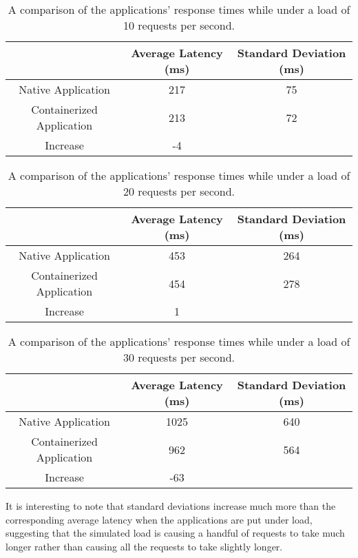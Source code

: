 \documentclass{article}
\begin{document}
\begin{table}[H]
\begin{tabular}{ |c|c|c| }
 \hline
 & Average Latency (ms) & Standard Deviation (ms) \\
 \hline
 Native Application & 217 & 75 \\
 \hline
 Containerized Application & 213 & 72 \\
 \hline\hline
 Increase & -4 & \\
 \hline
\end{tabular}
\caption{A comparison of the applications' response times while under a load of 10 requests per second.}
\label{latency-under-load-10}
\end{table}

\begin{table}[H]
\begin{tabular}{ |c|c|c| }
 \hline
 & Average Latency (ms) & Standard Deviation (ms) \\
 \hline
 Native Application & 453 & 264 \\
 \hline
 Containerized Application & 454 & 278 \\
 \hline\hline
 Increase & 1 & \\
 \hline
\end{tabular}
\caption{A comparison of the applications' response times while under a load of 20 requests per second.}
\label{latency-under-load-20}
\end{table}

\begin{table}[H]
\begin{tabular}{ |c|c|c| }
 \hline
 & Average Latency (ms) & Standard Deviation (ms) \\
 \hline
 Native Application & 1025 & 640 \\
 \hline
 Containerized Application & 962 & 564 \\
 \hline\hline
 Increase & -63 & \\
 \hline
\end{tabular}
\caption{A comparison of the applications' response times while under a load of 30 requests per second.}
\label{latency-under-load-30}
\end{table}

It is interesting to note that standard deviations increase much more than the corresponding average latency when the applications are put under load, suggesting that the simulated load is causing a handful of requests to take much longer rather than causing all the requests to take slightly longer.
\end{document}
